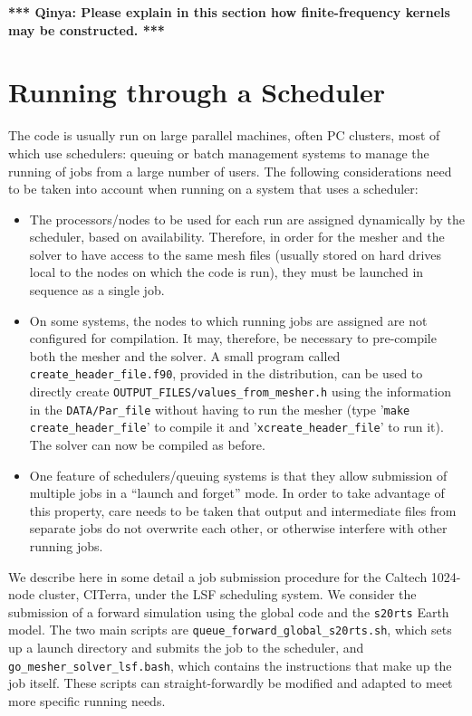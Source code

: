 \documentclass[onecolumn]{article}
\newcommand{\toqinya}[1]{\textbf{*** Qinya: #1 ***}}
\begin{document}
\toqinya{Please explain in this section how finite-frequency kernels
may be constructed.}

\section{Running through a Scheduler}
\label{section:scheduler}

The code is usually run on large parallel machines, often PC clusters,
most of which use schedulers: queuing or batch management systems to manage
the running of jobs from a large number of users.
The following considerations need to be taken into account when running on
a system that uses a scheduler:
\begin{itemize}
\item The processors/nodes to be used for each run are assigned dynamically
by the scheduler, based on availability.
Therefore, in order for the mesher and the solver to have access to the same
mesh files (usually stored on hard drives local to the nodes on which the
code is run), they must be launched in sequence as a single job.
\item On some systems, the nodes to which running jobs are assigned are
not configured for compilation.
It may, therefore, be necessary to pre-compile both the mesher and the solver.
A small program called \texttt{create\_header\_file.f90}, provided in the
distribution, can be used to directly create
\texttt{OUTPUT\_FILES/values\_from\_mesher.h} using the information in
the \texttt{DATA/Par\_file} without having to run the mesher
(type '\texttt{make create\_header\_file}' to compile it
and '\texttt{xcreate\_header\_file}' to run it).
The solver can now be compiled as before.
\item One feature of schedulers/queuing systems is that they allow
submission of multiple jobs in a ``launch and forget'' mode.
In order to take advantage of this property, care needs to be taken that
output and intermediate files from separate jobs do not overwrite each other,
or otherwise interfere with other running jobs.
\end{itemize}

We describe here in some detail a job submission procedure for the
Caltech 1024-node cluster, CITerra, under the LSF scheduling system.
We consider the submission of a forward simulation using the global
code and the \texttt{s20rts} Earth model.
The two main scripts are \texttt{queue\_forward\_global\_s20rts.sh},
which sets up a launch directory and submits the job to the scheduler,
and \texttt{go\_mesher\_solver\_lsf.bash}, which contains the instructions
that make up the job itself.
These scripts can straight-forwardly be modified and adapted to meet
more specific running needs.
\end{document}
